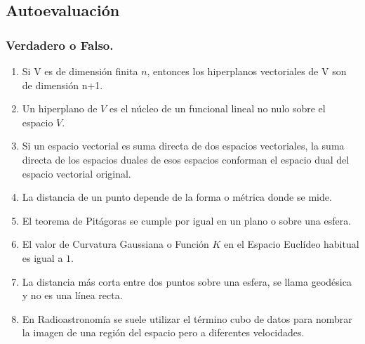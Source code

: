 \subsection{Autoevaluación}
 \label{Auto6}
 \bigskip

 
\subsubsection{Verdadero o Falso.}

\begin{enumerate}
\item
Si V es de dimensión finita $n$, entonces los hiperplanos vectoriales de V son de dimensión n+1.
\item
Un hiperplano de $V$ es el núcleo de un funcional lineal no nulo sobre el espacio $V$.
\item
Si un espacio vectorial es suma directa de dos espacios vectoriales, la suma directa de los espacios duales de esos espacios 
conforman el espacio dual del espacio vectorial original. 
\item
La distancia de un punto depende de la forma o métrica donde se mide.
\item
El teorema de Pitágoras se cumple por igual en un plano o sobre una esfera.
\item
El valor de Curvatura Gaussiana o Función $K$ en el Espacio Euclídeo habitual es igual a $1$.
\item
La distancia más corta entre dos puntos sobre una esfera, se llama geodésica y no es una línea recta.
\item
En Radioastronomía se suele utilizar el término cubo de datos para nombrar la imagen de una región del espacio pero a diferentes velocidades.
\end{enumerate}




